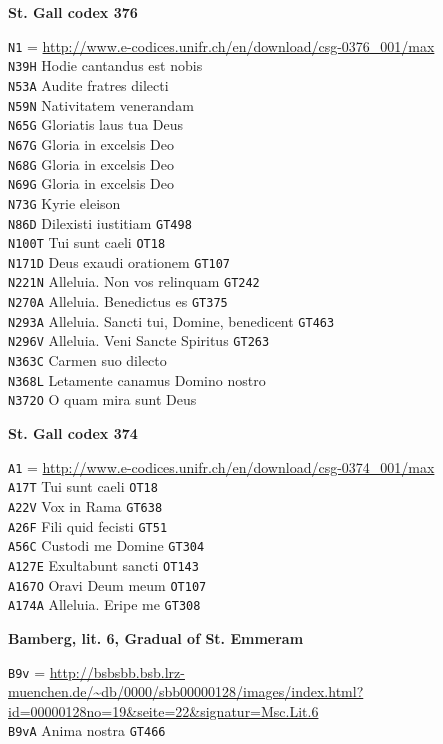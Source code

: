 \documentclass[a4paper]{article}
\begin{document}
{\begin{multicols}{2}
\noindent\textbf{St. Gall codex 376}

\noindent
\texttt{N1} = \url{http://www.e-codices.unifr.ch/en/download/csg-0376_001/max}\\
\texttt{N39H} Hodie cantandus est nobis\\
\texttt{N53A} Audite fratres dilecti\\
\texttt{N59N} Nativitatem venerandam\\
\texttt{N65G} Gloriatis laus tua Deus\\
\texttt{N67G} Gloria in excelsis Deo\\
\texttt{N68G} Gloria in excelsis Deo\\
\texttt{N69G} Gloria in excelsis Deo\\
\texttt{N73G} Kyrie eleison\\
\texttt{N86D} Dilexisti iustitiam \texttt{GT498}\\
\texttt{N100T} Tui sunt caeli \texttt{OT18}\\
\texttt{N171D} Deus exaudi orationem \texttt{GT107}\\
\texttt{N221N} Alleluia. Non vos relinquam \texttt{GT242}\\
\texttt{N270A} Alleluia. Benedictus es \texttt{GT375}\\
\texttt{N293A} Alleluia. Sancti tui, Domine, benedicent \texttt{GT463}\\
\texttt{N296V} Alleluia. Veni Sancte Spiritus \texttt{GT263}\\
\texttt{N363C} Carmen suo dilecto\\
\texttt{N368L} Letamente canamus Domino nostro\\
\texttt{N372O} O quam mira sunt Deus

\noindent\textbf{St. Gall codex 374}

\noindent
\texttt{A1} = \url{http://www.e-codices.unifr.ch/en/download/csg-0374_001/max}\\
\texttt{A17T} Tui sunt caeli \texttt{OT18}\\
\texttt{A22V} Vox in Rama \texttt{GT638}\\
\texttt{A26F} Fili quid fecisti \texttt{GT51}\\
\texttt{A56C} Custodi me Domine \texttt{GT304}\\
\texttt{A127E} Exultabunt sancti \texttt{OT143}\\
\texttt{A167O} Oravi Deum meum \texttt{OT107}\\
\texttt{A174A} Alleluia. Eripe me \texttt{GT308}

\noindent
\textbf{Bamberg, lit. 6, Gradual of St. Emmeram}

\noindent
\texttt{B9v} = \url{http://bsbsbb.bsb.lrz-muenchen.de/~db/0000/sbb00000128/images/index.html?id=00000128no=19&seite=22&signatur=Msc.Lit.6}\\
\texttt{B9vA} Anima nostra \texttt{GT466}

\end{multicols}
}
\end{document}
